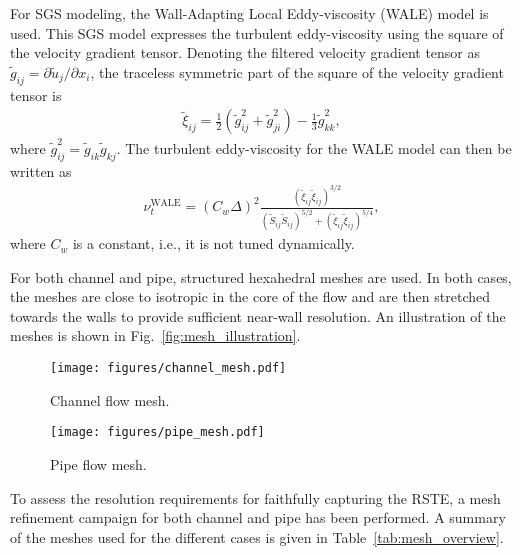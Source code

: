 For SGS modeling, the Wall-Adapting Local Eddy-viscosity (WALE) model \cite{ducros1998wall}  is used. This SGS model expresses the turbulent eddy-viscosity using the square of the velocity gradient tensor. Denoting the filtered velocity gradient tensor as $\tilde{g}_{ij} =\partial \tilde{u}_j/\partial x_i$, the traceless symmetric part of the square of the velocity gradient tensor is
\begin{align}
    \tilde{\xi}_{ij} = \frac{1}{2} \left( \tilde{g}_{ij}^2 + \tilde{g}_{ji}^2 \right) - \frac{1}{3} \tilde{g}_{kk}^2 ,
\end{align}
where $\tilde{g}_{ij}^2 = \tilde{g}_{ik}\tilde{g}_{kj}$.
The turbulent eddy-viscosity for the WALE model can then be written as
\begin{align}
    \nu_t^{\text{WALE}} = ( C_w \Delta )^2 \frac{( \tilde{\xi}_{ij} \tilde{\xi}_{ij} )^{3/2}}{( \tilde{S}_{ij} \tilde{S}_{ij} )^{5/2} + \left( \tilde{\xi}_{ij} \tilde{\xi}_{ij} \right)^{5/4}} ,
\end{align}
where $C_w$ is a constant, i.e., it is not tuned dynamically.

For both channel and pipe, structured hexahedral meshes are used.
In both cases, the meshes are close to isotropic in the core of the flow and are then stretched towards the walls to provide sufficient near-wall resolution.
An illustration of the meshes is shown in Fig.~\ref{fig:mesh_illustration}.

\begin{figure*}[ht]
    \centering
    \begin{subfigure}[t]{0.49\textwidth}
        \centering
        \texttt{[image: figures/channel\_mesh.pdf]}
        \caption{Channel flow mesh.}
        \label{fig:chan_flow_mesh}        
    \end{subfigure}%
    \hfill
    \begin{subfigure}[t]{0.49\textwidth}
        \centering
        \texttt{[image: figures/pipe\_mesh.pdf]}
        \caption{Pipe flow mesh.}
        \label{fig:pipe_flow_mesh}        
    \end{subfigure}
    \caption{Mesh topology for channel (Fig. \ref{fig:chan_flow_mesh}) and pipe flow (Fig. \ref{fig:pipe_flow_mesh}). The number of cells has been reduced in this figure for visualisation purposes.}
    \label{fig:mesh_illustration}
\end{figure*}

To assess the resolution requirements for faithfully capturing the RSTE, a mesh refinement campaign for both channel and pipe has been performed.
A summary of the meshes used for the different cases is given in Table~\ref{tab:mesh_overview}.

